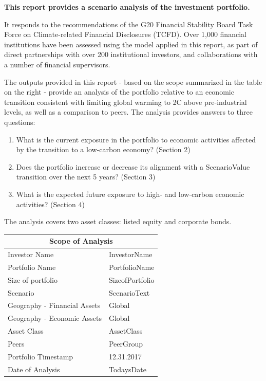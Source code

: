 \documentclass[10pt,table,a4]{article}\usepackage[]{graphicx}\usepackage[]{color}
\begin{document}
	\begin{multicols}{2}
		\textbf{This report provides a scenario analysis of the investment portfolio.} 
		
		It responds to the recommendations of the G20 Financial Stability Board Task Force on Climate-related Financial Disclosures (TCFD). Over 1,000 financial institutions have been assessed using the model applied in this report, as part of direct partnerships with over 200 institutional investors, and collaborations with a number of financial supervisors. 
		
		The outputs provided in this report - based on the scope summarized in the table on the right - provide an analysis of the portfolio relative to an economic transition consistent with limiting global warming to 2\degree C above pre-industrial levels, as well as a comparison to peers. The analysis provides answers to three questions: 
		
		\begin{enumerate}
			\item{What is the current exposure in the portfolio to economic activities affected by the transition to a low-carbon economy? (Section 2)}
			\item{Does the portfolio increase or decrease its alignment with a ScenarioValue transition over the next 5 years? (Section 3)}
			\item{What is the expected future exposure to high- and low-carbon economic activities? (Section 4)}
		\end{enumerate}
		
		The analysis covers two asset classes: listed equity and corporate bonds. 
		
		\begin{center}
			{
				\setlength{\tabcolsep}{10pt} %
				\renewcommand{\arraystretch}{1.5} %
				\begin{tabular}{ p{.35\linewidth} p{.49\linewidth} }
					\hline
					\multicolumn{2}{c}{\textbf{Scope of Analysis}} \\
					\hline
					Investor Name & InvestorName \\ 
					Portfolio Name & PortfolioName \\ 
					Size of portfolio & SizeofPortfolio \\ 
					Scenario & ScenarioText \\ 
					Geography - \newline Financial Assets & Global \\ 
					Geography - \newline Economic Assets & Global \\ 
					Asset Class & AssetClass \\ 
					Peers & PeerGroup \\
					Portfolio Timestamp & 12.31.2017 \\ 
					Date of Analysis & TodaysDate \\ 
					\hline
				\end{tabular}
			}
			

\end{center}
\end{multicols}
\end{document}
